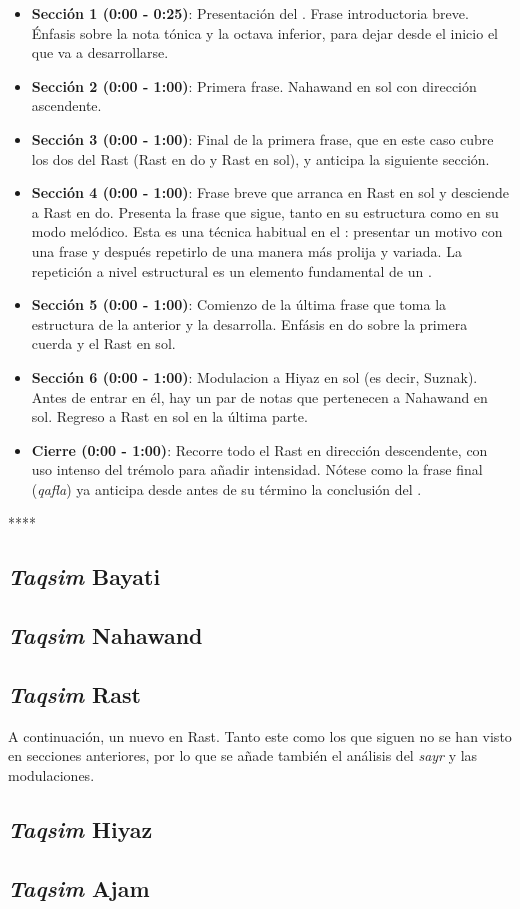\begin{itemize}
\item \textbf{Sección 1 (0:00 - 0:25)}: Presentación del \maqam. Frase introductoria breve. Énfasis sobre la nota tónica y la octava inferior, para dejar desde el inicio el \maqam que va a desarrollarse.
\item \textbf{Sección 2 (0:00 - 1:00)}: Primera frase. Nahawand en sol con dirección ascendente.
\item \textbf{Sección 3 (0:00 - 1:00)}: Final de la primera frase, que en este caso cubre los dos \ashnas del \maqam Rast (Rast en do y Rast en sol), y anticipa la siguiente sección.
\item \textbf{Sección 4 (0:00 - 1:00)}: Frase breve que arranca en Rast en sol y desciende a Rast en do. Presenta la frase que sigue, tanto en su estructura como en su modo melódico. Esta es una técnica habitual en el \taqsimb: presentar un motivo con una frase y después repetirlo de una manera más prolija y variada. La repetición a nivel estructural es un elemento fundamental de un \taqsimb.
\item \textbf{Sección 5 (0:00 - 1:00)}: Comienzo de la última frase que toma la estructura de la anterior y la desarrolla. Enfásis en do sobre la primera cuerda y el \yins Rast en sol.
\item \textbf{Sección 6 (0:00 - 1:00)}: Modulacion a \yins Hiyaz en sol (es decir, \maqam Suznak). Antes de entrar en él, hay un par de notas que pertenecen a Nahawand en sol. Regreso a Rast en sol en la última parte.
\item \textbf{Cierre (0:00 - 1:00)}: Recorre todo el \maqam Rast en dirección descendente, con uso intenso del trémolo para añadir intensidad. Nótese como la frase final (\emph{qafla}) ya anticipa desde antes de su término la conclusión del \taqsim.
\end{itemize}

****
\subsection{\emph{Taqsim} Bayati}

\subsection{\emph{Taqsim} Nahawand}

\subsection{\emph{Taqsim} Rast}

A continuación, un nuevo \taqsim en \maqam Rast. Tanto este como los que siguen no se han visto en secciones anteriores, por lo que se añade también el análisis del \emph{sayr} y las modulaciones.

\subsection{\emph{Taqsim} Hiyaz}


\subsection{\emph{Taqsim} Ajam}